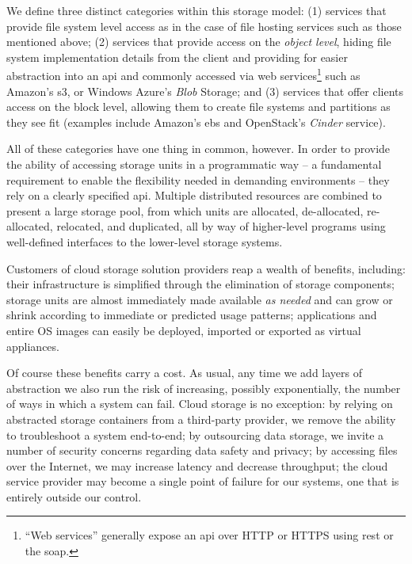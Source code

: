 We define three distinct categories within this
storage model: (1) services that provide file system
level access as in the case of file hosting services
such as those mentioned above; (2) services that
provide access on the {\em object level}, hiding file
system implementation details from the client and
providing for easier abstraction into an \gls{api} and
commonly accessed via web services\footnote{``Web
services'' generally expose an \gls{api} over HTTP or HTTPS
using \gls{rest} or the
\gls{soap}.} such as Amazon's
\gls{s3}, or Windows Azure's {\em Blob}
Storage; and (3) services that offer clients access on
the block level, allowing them to create file systems
and partitions as they see fit (examples include
Amazon's \gls{ebs} and
OpenStack's {\em Cinder} service).

All of these categories have one thing in common,
however.  In order to provide the ability of accessing
storage units in a programmatic way -- a fundamental
requirement to enable the flexibility needed in
demanding environments -- they rely on a clearly
specified \gls{api}.  Multiple distributed resources
are combined to present a large storage pool, from
which units are allocated, de-allocated, re-allocated,
relocated, and duplicated, all by way of higher-level
programs using well-defined interfaces to the
lower-level storage systems.

Customers of cloud storage solution providers reap a
wealth of benefits, including: their infrastructure is
simplified through the elimination of storage
components; storage units are almost immediately made
available {\em as needed} and can grow or shrink
according to immediate or predicted usage patterns;
applications and entire OS images can easily be
deployed, imported or exported as virtual appliances.

Of course these benefits carry a cost.  As usual, any
time we add layers of abstraction we also run the risk
of increasing, possibly exponentially, the number of
ways in which a system can fail.  Cloud storage is
no exception: by relying on abstracted storage
containers from a third-party provider, we remove the
ability to troubleshoot a system end-to-end; by
outsourcing data storage, we invite a number of
security concerns regarding data safety and
privacy; by accessing files over
the Internet, we may increase latency and decrease
throughput; the cloud service provider may become a
single point of failure for our systems, one that is
entirely outside our control.

